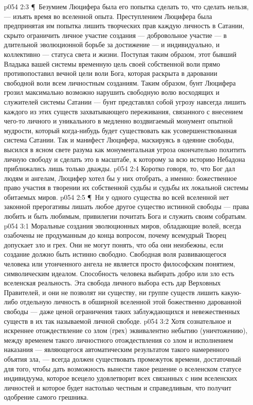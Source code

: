 \vs p054 2:3 \P\ Безумием Люцифера была его попытка сделать то, что сделать нельзя, --- изъять время во вселенной опыта. Преступлением Люцифера была предпринятая им попытка лишить творческих прав каждую личность в Сатании, скрыто ограничить личное участие создания --- добровольное участие --- в длительной эволюционной борьбе за достижение --- и индивидуально, и коллективно --- статуса света и жизни. Поступая таким образом, этот бывший Владыка вашей системы временную цель своей собственной воли прямо противопоставил вечной цели воли Бога, которая раскрыта в даровании свободной воли всем личностным созданиям. Таким образом, бунт Люцифера грозил максимально возможно нарушить свободную волю восходящих и служителей системы Сатании --- бунт представлял собой угрозу навсегда лишить каждого из этих существ захватывающего переживания, связанного с внесением чего\hyp{}то личного и уникального в медленно воздвигаемый монумент опытной мудрости, который когда\hyp{}нибудь будет существовать как усовершенствованная система Сатании. Так и манифест Люцифера, маскируясь в одеяние свободы, высился в ясном свете разума как монументальная угроза окончательно похитить личную свободу и сделать это в масштабе, к которому за всю историю Небадона приближались лишь только дважды.
\vs p054 2:4 Коротко говоря, то, что Бог дал людям и ангелам, Люцифер хотел бы у них отобрать, а именно: божественное право участия в творении их собственной судьбы и судьбы их локальной системы обитаемых миров.
\vs p054 2:5 \P\ Ни у одного существа во всей вселенной нет законной прерогативы лишать любое другое существо истинной свободы --- права любить и быть любимым, привилегии почитать Бога и служить своим собратьям.
\vs p054 3:1 Моральные создания эволюционных миров, обладающие волей, всегда озабочены не продуманным до конца вопросом, почему всемудрый Творец допускает зло и грех. Они не могут понять, что оба они неизбежны, если создание должно быть истинно свободно. Свободная воля развивающегося человека или утонченного ангела не является просто философским понятием, символическим идеалом. Способность человека выбирать добро или зло есть вселенская реальность. Эта свобода личного выбора есть дар Верховных Правителей, и они не позволят ни существу, ни группе существ лишить какую\hyp{}либо отдельную личность в обширной вселенной этой божественно дарованной свободы --- даже ценой ограничения таких заблуждающихся и невежественных существ в их так называемой личной свободе.
\vs p054 3:2 Хотя сознательное и искреннее отождествление со злом (грех) эквивалентно небытию (уничтожению), между временем такого личностного отождествления со злом и исполнением наказания --- являющегося автоматическим результатом такого намеренного объятия зла, --- всегда должен существовать промежуток времени, достаточный для того, чтобы дать возможность вынести такое решение о вселенском статусе индивидуума, которое всецело удовлетворит всех связанных с ним вселенских личностей и которое будет настолько честным и справедливым, что получит одобрение самого грешника.
